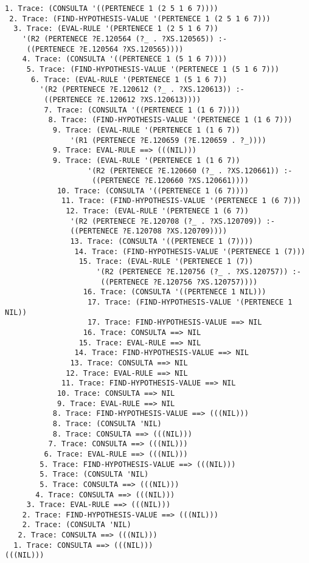 \documentclass[nochap]{apuntes}
\begin{document}
\begin{verbatim}
1. Trace: (CONSULTA '((PERTENECE 1 (2 5 1 6 7))))
 2. Trace: (FIND-HYPOTHESIS-VALUE '(PERTENECE 1 (2 5 1 6 7)))
  3. Trace: (EVAL-RULE '(PERTENECE 1 (2 5 1 6 7))
    '(R2 (PERTENECE ?E.120564 (?_ . ?XS.120565)) :-
     ((PERTENECE ?E.120564 ?XS.120565))))
    4. Trace: (CONSULTA '((PERTENECE 1 (5 1 6 7))))
     5. Trace: (FIND-HYPOTHESIS-VALUE '(PERTENECE 1 (5 1 6 7)))
      6. Trace: (EVAL-RULE '(PERTENECE 1 (5 1 6 7))
        '(R2 (PERTENECE ?E.120612 (?_ . ?XS.120613)) :-
         ((PERTENECE ?E.120612 ?XS.120613))))
         7. Trace: (CONSULTA '((PERTENECE 1 (1 6 7))))
          8. Trace: (FIND-HYPOTHESIS-VALUE '(PERTENECE 1 (1 6 7)))
           9. Trace: (EVAL-RULE '(PERTENECE 1 (1 6 7)) 
               '(R1 (PERTENECE ?E.120659 (?E.120659 . ?_))))
           9. Trace: EVAL-RULE ==> (((NIL)))
           9. Trace: (EVAL-RULE '(PERTENECE 1 (1 6 7))
                   '(R2 (PERTENECE ?E.120660 (?_ . ?XS.120661)) :-
                    ((PERTENECE ?E.120660 ?XS.120661))))
            10. Trace: (CONSULTA '((PERTENECE 1 (6 7))))
             11. Trace: (FIND-HYPOTHESIS-VALUE '(PERTENECE 1 (6 7)))
              12. Trace: (EVAL-RULE '(PERTENECE 1 (6 7))
               '(R2 (PERTENECE ?E.120708 (?_ . ?XS.120709)) :-
               ((PERTENECE ?E.120708 ?XS.120709))))
               13. Trace: (CONSULTA '((PERTENECE 1 (7))))
                14. Trace: (FIND-HYPOTHESIS-VALUE '(PERTENECE 1 (7)))
                 15. Trace: (EVAL-RULE '(PERTENECE 1 (7))
                     '(R2 (PERTENECE ?E.120756 (?_ . ?XS.120757)) :-
                      ((PERTENECE ?E.120756 ?XS.120757))))
                  16. Trace: (CONSULTA '((PERTENECE 1 NIL)))
                   17. Trace: (FIND-HYPOTHESIS-VALUE '(PERTENECE 1 NIL))
                   17. Trace: FIND-HYPOTHESIS-VALUE ==> NIL
                  16. Trace: CONSULTA ==> NIL
                 15. Trace: EVAL-RULE ==> NIL
                14. Trace: FIND-HYPOTHESIS-VALUE ==> NIL
               13. Trace: CONSULTA ==> NIL
              12. Trace: EVAL-RULE ==> NIL
             11. Trace: FIND-HYPOTHESIS-VALUE ==> NIL
            10. Trace: CONSULTA ==> NIL
            9. Trace: EVAL-RULE ==> NIL
           8. Trace: FIND-HYPOTHESIS-VALUE ==> (((NIL)))
           8. Trace: (CONSULTA 'NIL)
           8. Trace: CONSULTA ==> (((NIL)))
          7. Trace: CONSULTA ==> (((NIL)))
         6. Trace: EVAL-RULE ==> (((NIL)))
        5. Trace: FIND-HYPOTHESIS-VALUE ==> (((NIL)))
        5. Trace: (CONSULTA 'NIL)
        5. Trace: CONSULTA ==> (((NIL)))
       4. Trace: CONSULTA ==> (((NIL)))
     3. Trace: EVAL-RULE ==> (((NIL)))
    2. Trace: FIND-HYPOTHESIS-VALUE ==> (((NIL)))
    2. Trace: (CONSULTA 'NIL)
   2. Trace: CONSULTA ==> (((NIL)))
  1. Trace: CONSULTA ==> (((NIL)))
(((NIL)))
\end{verbatim}
\end{document}

